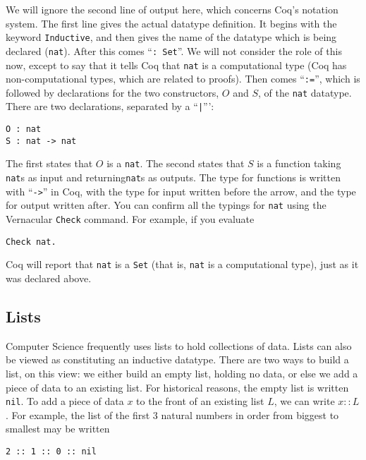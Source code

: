 \documentclass{book}[12pt]
\begin{document}
\noindent We will ignore the second line of output here, which
concerns Coq's notation system.  The first line gives the actual
datatype definition.  It begins with the keyword \texttt{Inductive},
and then gives the name of the datatype which is being declared
(\texttt{nat}).  After this comes ``\texttt{: Set}''.  We will not
consider the role of this now, except to say that it tells Coq that
\texttt{nat} is a computational type (Coq has non-computational types,
which are related to proofs).  Then comes ``\texttt{:=}'', which is
followed by declarations for the two constructors, $O$ and $S$, of the
\texttt{nat} datatype.  There are two declarations, separated by a
``\texttt{|}''':

\begin{verbatim}
O : nat 
S : nat -> nat
\end{verbatim}

\noindent The first states that $O$ is a \texttt{nat}.  The second
states that $S$ is a function taking \texttt{nat}s as input and
returning\texttt{nat}s as outputs.  The type for functions is written
with ``\texttt{->}'' in Coq, with the type for input written before
the arrow, and the type for output written after.  You can confirm all
the typings for \texttt{nat} using the Vernacular \texttt{Check}
command.  For example, if you evaluate

\begin{verbatim}
Check nat.
\end{verbatim}

\noindent Coq will report that \texttt{nat} is a \texttt{Set} (that
is, \texttt{nat} is a computational type), just as it was declared
above.

\subsection{Lists}

Computer Science frequently uses lists to hold collections of data.
Lists can also be viewed as constituting an inductive datatype.  There
are two ways to build a list, on this view: we either build an empty
list, holding no data, or else we add a piece of data to an existing
list.  For historical reasons, the empty list is written \texttt{nil}.
To add a piece of data $x$ to the front of an existing list $L$, we
can write $x :: L$.  For example, the list of the first 3 natural numbers
in order from biggest to smallest may be written

\begin{verbatim}
2 :: 1 :: 0 :: nil
\end{verbatim}
\end{document}
